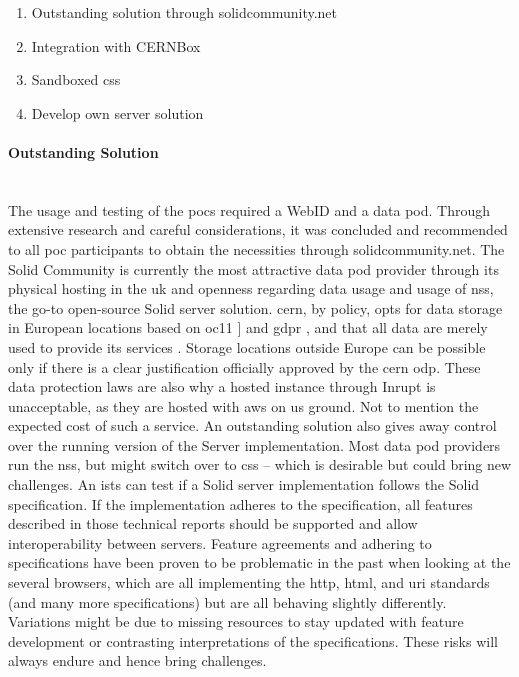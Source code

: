 \begin{enumerate}
    \item Outstanding solution through solidcommunity.net
    \item Integration with CERNBox
    \item Sandboxed \gls{css}
    \item Develop own server solution
\end{enumerate}

\paragraph{Outstanding Solution}\mbox{}\\

The usage and testing of the \glspl{poc} required a WebID and a data pod. Through extensive research and careful considerations, it was concluded and recommended to all \gls{poc} participants to obtain the necessities through solidcommunity.net. The Solid Community is currently the most attractive data pod provider through its physical hosting in the \gls{uk} and openness regarding data usage and usage of \gls{nss}, the go-to open-source Solid server solution. \gls{cern}, by policy, opts for data storage in European locations based on \gls{oc11} \cite{oc11}] and \gls{gdpr} \cite{gdpr}, and that all data are merely used to provide its services \cite{policy-cern-server}. Storage locations outside Europe can be possible only if there is a clear justification officially approved by the \gls{cern} \gls{odp}. These data protection laws are also why a hosted instance through Inrupt \cite{inrupt} is unacceptable, as they are hosted with \gls{aws} on \gls{us} ground. Not to mention the expected cost of such a service. An outstanding solution also gives away control over the running version of the Server implementation. Most data pod providers run the \gls{nss}, but might switch over to \gls{css} -- which is desirable but could bring new challenges.
An \gls{ists} \cite{solid-test-suite} can test if a Solid server implementation follows the Solid specification. If the implementation adheres to the specification, all features described in those technical reports should be supported and allow interoperability between servers. Feature agreements and adhering to specifications have been proven to be problematic in the past when looking at the several browsers, which are all implementing the \gls{http}, \gls{html}, and \gls{uri} standards (and many more specifications) but are all behaving slightly differently. Variations might be due to missing resources to stay updated with feature development or contrasting interpretations of the specifications. These risks will always endure and hence bring challenges.
\vspace{0.5cm}
